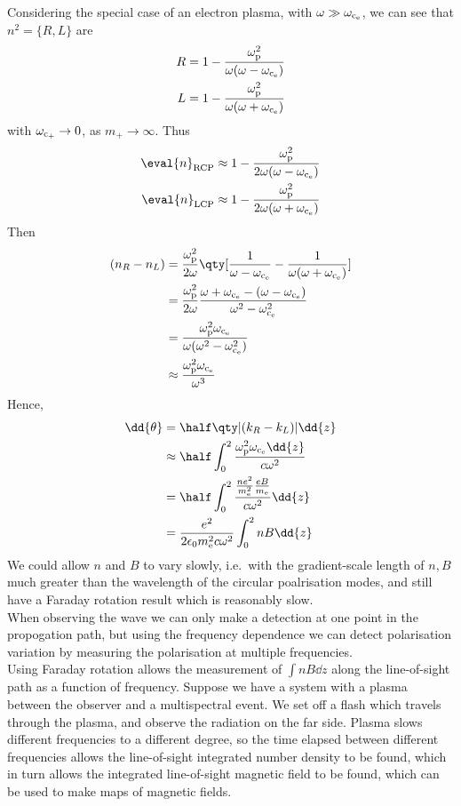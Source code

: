 \documentclass{book}         		                %
\begin{document}
Considering the special case of an electron plasma, with $\omega \gg
\omega_{\rm c_e}$, we can see that $n^2 = \{R,L\}$ are
\begin{align*}
  R & = 1 - \frac{\omega_{\rm p}^2}{\omega(\omega-\omega_{\rm c_e})} \\
  L & = 1 - \frac{\omega_{\rm p}^2}{\omega(\omega+\omega_{\rm c_e})}
\end{align*}
with $\omega_{\rm c_+} \to 0$, as $m_+ \to \infty$.
Thus
\begin{align*}
  \eval{n}_{\rm RCP} &\approx 1 - \frac{\omega_{\rm p}^2}{2 \omega (\omega-\omega_{\rm c_e})} \\
  \eval{n}_{\rm LCP} &\approx 1 - \frac{\omega_{\rm p}^2}{2 \omega(\omega+\omega_{\rm c_e})}
\end{align*}
Then
\begin{align*}
  (n_R - n_L) &= \frac{\omega_{\rm p}^2}{2 \omega} \qty[ \frac{1}{\omega - \omega_{\rm c_e}} - \frac{1}{\omega(\omega+\omega_{\rm c_e})}]\\
&= \frac{\omega_{\rm p}^2}{2 \omega} \frac{\omega + \omega_{\rm c_e}-(\omega-\omega_{\rm c_e})}{\omega^2 - \omega_{\rm c_e}^2} \\
&= \frac{\omega_{\rm p}^2 \omega_{\rm c_e}}{\omega(\omega^2-\omega_{\rm c_e}^2)} \\
&\approx \frac{\omega_{\rm p}^2 \omega_{\rm c_e}}{\omega^3} \\
\end{align*}
Hence,
\begin{align*}
  \dd{\theta} &= \half \qty| (k_R - k_L)| \dd{z} \\
& \approx \half \int_0^2 \frac{\omega_{\rm p}^2 \omega_{\rm c_e} \dd{z}}{c \omega^2} \\
&= \half \int_0^2 \frac{ \frac{ne^2}{m_{\rm e}^2} \frac{eB}{m_{\rm e}}}{ c \omega^2} \dd{z}\\
&= \frac{e^2}{2 \epsilon_0 m_{\rm e}^2 c \omega^2} \int_0^2 nB \dd{z}
\end{align*}
We could allow $n$ and $B$ to vary slowly, i.e.\ with the
gradient-scale length of $n,B$ much greater than the wavelength of the
circular poalrisation modes, and still have a Faraday rotation result
which is reasonably slow. \\
When observing the wave we can only make a detection at one point in
the propogation path, but using the frequency dependence we can detect
polarisation variation by measuring the polarisation at multiple
frequencies.\\
Using Faraday rotation allows the measurement of $\int nB \dd{z}$
along the line-of-sight path as a function of frequency. Suppose we
have a system with a plasma between the observer and a multispectral
event. We set off a flash which travels through the plasma, and
observe the radiation on the far side. Plasma slows different
frequencies to a different degree, so the time elapsed between
different frequencies allows the line-of-sight integrated number
density to be found, which in turn allows the integrated line-of-sight
magnetic field to be found, which can be used to make maps of magnetic
fields.
\end{document}
